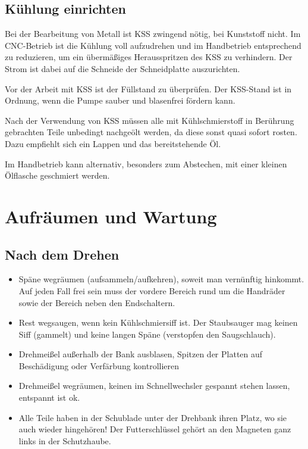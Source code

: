 \documentclass{\basedir/fablab-document}
\begin{document}
\subsection{Kühlung einrichten}

Bei der Bearbeitung von Metall ist KSS zwingend nötig, bei Kunststoff nicht.
Im CNC-Betrieb ist die Kühlung voll aufzudrehen und im Handbetrieb entsprechend zu reduzieren,
um ein übermäßiges Herausspritzen des KSS zu verhindern.
Der Strom ist dabei auf die Schneide der Schneidplatte auszurichten.

Vor der Arbeit mit KSS ist der Füllstand zu überprüfen. Der KSS-Stand ist in Ordnung, wenn die Pumpe sauber und blasenfrei fördern kann.

Nach der Verwendung von KSS müssen alle mit Kühlschmierstoff in Berührung gebrachten Teile unbedingt nachgeölt werden, da diese sonst quasi sofort rosten. Dazu empfiehlt sich ein Lappen und das bereitstehende Öl.

Im Handbetrieb kann alternativ, besonders zum Abstechen, mit einer kleinen Ölflasche geschmiert werden. 

\section{Aufräumen und Wartung}

\subsection{Nach dem Drehen}

\begin{itemize}
 \item Späne wegräumen (aufsammeln/aufkehren), soweit man vernünftig hinkommt. Auf jeden Fall frei sein muss der vordere Bereich rund um die Handräder sowie der Bereich neben den Endschaltern.
 \item Rest wegsaugen, wenn kein Kühlschmiersiff ist. Der Staubsauger mag keinen Siff (gammelt) und keine langen Späne (verstopfen den Saugschlauch).
 \item Drehmeißel außerhalb der Bank ausblasen, Spitzen der Platten auf Beschädigung oder Verfärbung kontrollieren
 \item Drehmeißel wegräumen, keinen im Schnellwechsler gespannt stehen lassen, entspannt ist ok.
 \item Alle Teile haben in der Schublade unter der Drehbank ihren Platz, wo sie auch wieder hingehören! Der Futterschlüssel gehört an den Magneten ganz links in der Schutzhaube.
\end{itemize}
\end{document}
